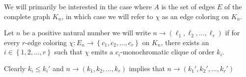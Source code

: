 We will primarily be interested in the case where $A$ is the set of edges $E$ of the complete graph $K_n$, in which case we will refer to $\chi$ as an edge coloring on $K_n$.

\begin{definition}
	Let $n$ be a positive natural number we will write $n \to (\ell_1, \ell_2, \ldots, \ell_{r})$ if for every $r$-edge coloring $\chi: E_{n} \to \left\{c_1, c_2, \ldots, c_{r}\right\}$ on $K_n$, there exists an $i \in \left\{1, 2, \ldots, r\right\}$ such that $\chi$ emits a $c_{i}$-monochromatic clique of order $k_{i}$.
\end{definition}
\begin{remark}
	Clearly $k_i \leq k_i'$ and $n \to (k_1, k_2, \ldots, k_{r})$ implies that $n \to (k_1', k_2', \ldots, k_{r}')$
\end{remark}



